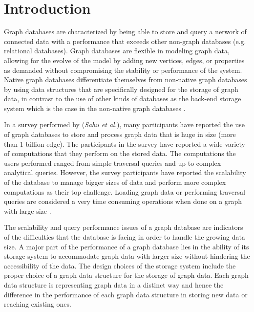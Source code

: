 {\chapter{Introduction}
\label{chap:Introduction}

Graph databases are characterized by being able to store and query a network of connected data with a performance that exceeds other non-graph databases (e.g. relational databases). Graph databases are flexible in modeling graph data, allowing for the evolve of the model by adding new vertices, edges, or properties as demanded without compromising the stability or performance of the system. Native graph databases differentiate themselves from non-native graph databases by using data structures that are specifically designed for the storage of graph data, in contrast to the use of other kinds of databases as the back-end storage system which is the case in the non-native graph databases \cite{robinson2013graph}. 

In a survey performed by (\textit{Sahu et al.}), many participants have reported the use of graph databases to store and process graph data that is huge in size (more than 1 billion edge). The participants in the survey have reported a wide variety of computations that they perform on the stored data. The computations the users performed ranged from simple traversal queries and up to complex analytical queries. However, the survey participants have reported the scalability of the database to manage bigger sizes of data and perform more complex computations as their top challenge. Loading graph data or performing traversal queries are considered a very time consuming operations when done on a graph with large size \cite{sahu2017ubiquity}.

The scalability and query performance issues of a graph database are indicators of the difficulties that the database is facing in order to handle the growing data size. A major part of the performance of a graph database lies in the ability of its storage system to accommodate graph data with larger size without hindering the accessibility of the data. The design choices of the storage system include the proper choice of a graph data structure for the storage of graph data. Each graph data structure is representing graph data in a distinct way and hence the difference in the performance of each graph data structure in storing new data or reaching existing ones.\\


}
